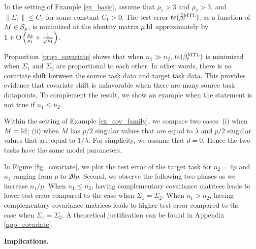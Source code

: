 \begin{proposition}\label{prop_covariate}
	In the setting of Example \ref{ex_basic}, assume that $\rho_1 > 3$ and $\rho_2>3$,
and $\|\Sigma_1\|\le C_1$ for some constant $C_1>0$. %
The test error $te(\hat{\beta}_t^{\text{MTL}})$, as a function of $M\in \mathcal{S}_{\mu}$, is minimized at the identity matrix $\mu\operatorname{Id}$ approximately by
$1+ \operatorname{O}\left(\frac{\rho_2}{\rho_1} + \frac{1}{\sqrt {\rho_1}}\right)$.
\end{proposition}
Proposition \ref{prop_covariate} shows that when $n_1\gg n_2$, $te(\hat{\beta}_t^{\text{MTL}})$ is minimized when $\Sigma_1$ and $\Sigma_2$ are proportional to each other.
In other words, there is no covariate shift between the source task data and target task data.
This provides evidence that covariate shift is unfavorable when there are many source task datapoints,
To complement the result, we show an example when the statement is not true if $n_1 \le n_2$.

\begin{example}\label{ex_complement}
	Within the setting of Example \ref{ex_cov_family}, we compare two cases: (i) when $M = \operatorname{Id}$; (ii) when $M$ has $p/2$ singular values that are equal to $\lambda$ and $p/2$ singular values that are equal to $1 / \lambda$.
	For simplicity, we assume that $d = 0$.
	Hence the two tasks have the same model parameters.

	In Figure \ref{fig_covariate}, we plot the test error of the target task for $n_2 = 4p$ and $n_1$ ranging from $p$ to $20p$.
	Second, we observe the following two phases as we increase $n_1 / p$.
	When $n_1 \le n_2$, having complementary covariance matrices leads to lower test error compared to the case when $\Sigma_1 = \Sigma_2$.
	When $n_1 > n_2$, having complementary covariance matrices leads to higher test error compared to the case when $\Sigma_1 = \Sigma_2$.
	A theoretical justification can be found in Appendix \ref{app_covariate}.
\end{example}


\textbf{Implications.}



